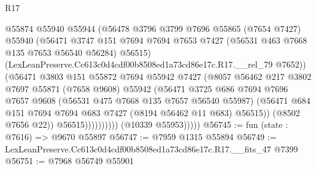 \begin{lexlean}{R17}
\begin{coremodule}
                              @55874
                              @55940
                              @55944
                              (@56478
                                @3796
                                @3799
                                @7696
                                @55865
                                (@7654 @7427)
                                @55940
                                (@56471
                                  @3747
                                  @151
                                  @7694
                                  @7694
                                  @7653
                                  @7427
                                  (@56531 @463 @7668 @135 @7653 @56540 @56284)
                                  @56515)
                                (LexLeanPreserve.Cc613c0d4cdf00b8508ed1a73cd86e17c.R17.__rel_79
                                  @7652))
                              (@56471
                                @3803
                                @151
                                @55872
                                @7694
                                @55942
                                @7427
                                (@8057
                                  @56462
                                  @217
                                  @3802
                                  @7697
                                  @55871
                                  (@7658 @9608)
                                  @55942
                                  (@56471
                                    @3725
                                    @686
                                    @7694
                                    @7696
                                    @7657
                                    @9608
                                    (@56531 @475 @7668 @135 @7657 @56540 @55987)
                                    (@56471
                                      @684
                                      @151
                                      @7694
                                      @7694
                                      @683
                                      @7427
                                      (@8194 @56462 @11 @683)
                                      @56515))
                                  (@8502 @7656 @22))
                                @56515))))))))))
            (@10339 @55953)))))
@56745 := fun (state : @7616) => @9670 @55897
@56747 := @7959 @1315 @55894
@56749 := LexLeanPreserve.Cc613c0d4cdf00b8508ed1a73cd86e17c.R17.__fits_47 @7399
@56751 := @7968 @56749 @55901

\end{coremodule}
\end{lexlean}

